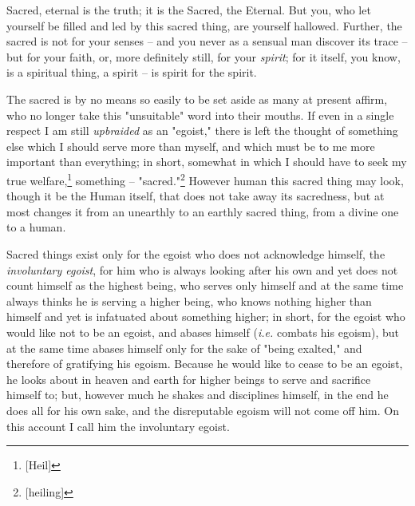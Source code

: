 Sacred, eternal is the truth; it is the Sacred, the Eternal. But you, who let 
yourself be filled and led by this sacred thing, are yourself hallowed. 
Further, the sacred is not for your senses -- and you never as a sensual man 
discover its trace -- but for your faith, or, more definitely still, for your 
\textit{spirit}; for it itself, you know, is a spiritual thing, a spirit -- is 
spirit for the spirit.

The sacred is by no means so easily to be set aside as many at present affirm, 
who no longer take this "{}unsuitable"{} word into their mouths. If even in a 
single respect I am still \textit{upbraided} as an "{}egoist,"{} there is left 
the thought of something else which I should serve more than myself, and which 
must be to me more important than everything; in short, somewhat in which I 
should have to seek my true welfare,\footnote{[Heil]} something -- 
"{}sacred."{}\footnote{[heiling]} However human this sacred thing may look, 
though it be the Human itself, that does not take away its sacredness, but at 
most changes it from an unearthly to an earthly sacred thing, from a divine 
one to a human.

Sacred things exist only for the egoist who does not acknowledge himself, the 
\textit{involuntary egoist}, for him who is always looking after his own and 
yet does not count himself as the highest being, who serves only himself and 
at the same time always thinks he is serving a higher being, who knows nothing 
higher than himself and yet is infatuated about something higher; in short, 
for the egoist who would like not to be an egoist, and abases himself 
(\textit{i.e.} combats his egoism), but at the same time abases himself only 
for the sake of "{}being exalted,"{} and therefore of gratifying his egoism. 
Because he would like to cease to be an egoist, he looks about in heaven and 
earth for higher beings to serve and sacrifice himself to; but, however much 
he shakes and disciplines himself, in the end he does all for his own sake, 
and the disreputable egoism will not come off him. On this account I call him 
the involuntary egoist.

